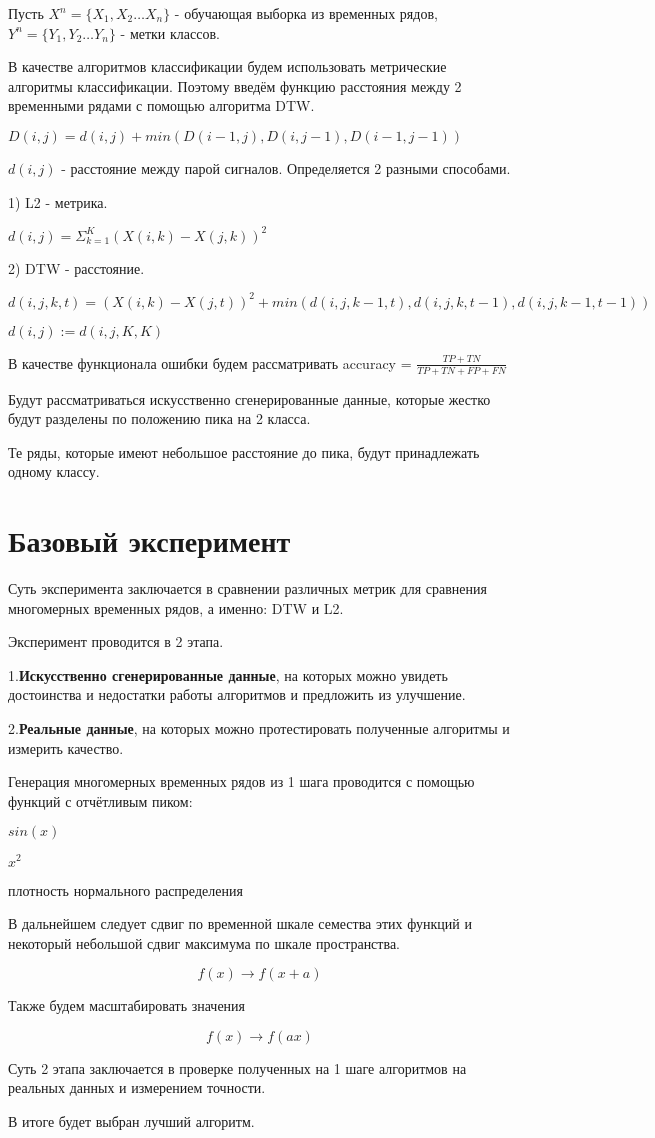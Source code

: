 \documentclass[12pt, twoside]{article}
\begin{document}
Пусть $X^n = \{X_1, X_2 \dots X_n\}$ - обучающая выборка из временных рядов, $Y^n = \{Y_1, Y_2 \dots Y_n\}$ - метки классов.

В качестве алгоритмов классификации будем использовать метрические алгоритмы классификации. Поэтому введём функцию расстояния между 2 временными рядами с помощью алгоритма DTW.

$D(i, j) = d(i, j) + min(D(i - 1, j), D(i, j - 1), D(i - 1, j - 1))$

$d(i, j)$ - расстояние между парой сигналов. Определяется 2 разными способами.

1) L2 - метрика.

$d(i, j) = \Sigma_{k = 1}^K(X(i, k) - X(j, k))^2$

2) DTW - расстояние.

$d(i, j, k, t) = (X(i, k) - X(j, t)) ^ 2 + min(d(i, j, k - 1, t), d(i, j, k, t - 1), d(i, j, k - 1, t - 1))$

$d(i, j) := d(i, j, K, K)$

В качестве функционала ошибки будем рассматривать accuracy = $\frac{TP + TN}{TP + TN + FP + FN}$

Будут рассматриваться искусственно сгенерированные данные, которые жестко будут разделены по положению пика на 2 класса.

Те ряды, которые имеют небольшое расстояние до пика, будут принадлежать одному классу.


\section{Базовый эксперимент}

Суть эксперимента заключается в сравнении различных метрик для сравнения многомерных временных рядов, а именно: DTW и L2.

Эксперимент проводится в 2 этапа.

1.\textbf{Искусственно сгенерированные данные}, на которых можно увидеть достоинства и недостатки работы алгоритмов и предложить из улучшение.

2.\textbf{Реальные данные}, на которых можно протестировать полученные алгоритмы и измерить качество.

Генерация многомерных временных рядов из 1 шага проводится с помощью функций с отчётливым пиком:

$sin(x)$

$x^2$

плотность нормального распределения

В дальнейшем следует сдвиг по временной шкале семества этих функций и некоторый небольшой сдвиг максимума по шкале пространства. 

$$f(x) \rightarrow f(x + a)$$

Также будем масштабировать значения 

$$f(x) \rightarrow f(ax)$$

Суть 2 этапа заключается в проверке полученных на 1 шаге алгоритмов на реальных данных и измерением точности.

В итоге будет выбран лучший алгоритм.



\nocite{*}
 


\end{document}
